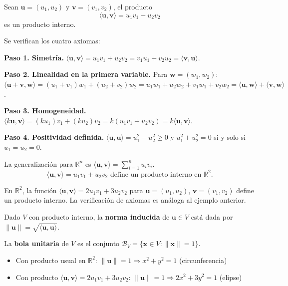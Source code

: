 \begin{example}
Sean $\mathbf{u} = (u_1, u_2)$ y $\mathbf{v} = (v_1, v_2)$, el producto $$\langle \mathbf{u}, \mathbf{v} \rangle = u_1v_1 + u_2v_2$$ es un producto interno.
\begin{myproof}
Se verifican los cuatro axiomas:

\textbf{Paso 1. Simetría.} $\langle \mathbf{u}, \mathbf{v} \rangle = u_1v_1 + u_2v_2 = v_1u_1 + v_2u_2 = \langle \mathbf{v}, \mathbf{u} \rangle$.

\textbf{Paso 2. Linealidad en la primera variable.} Para $\mathbf{w} = (w_1, w_2)$:
$\langle \mathbf{u} + \mathbf{v}, \mathbf{w} \rangle = (u_1 + v_1)w_1 + (u_2 + v_2)w_2 = u_1w_1 + u_2w_2 + v_1w_1 + v_2w_2 = \langle \mathbf{u}, \mathbf{w} \rangle + \langle \mathbf{v}, \mathbf{w} \rangle$.

\textbf{Paso 3. Homogeneidad.} $\langle k\mathbf{u}, \mathbf{v} \rangle = (ku_1)v_1 + (ku_2)v_2 = k(u_1v_1 + u_2v_2) = k\langle \mathbf{u}, \mathbf{v} \rangle$.

\textbf{Paso 4. Positividad definida.} $\langle \mathbf{u}, \mathbf{u} \rangle = u_1^2 + u_2^2 \geq 0$ y $u_1^2 + u_2^2 = 0$ si y solo si $u_1 = u_2 = 0$.

La generalización para $\mathbb{R}^n$ es $\langle \mathbf{u}, \mathbf{v} \rangle = \sum_{i=1}^n u_i v_i$.
$$\boxed{\langle \mathbf{u}, \mathbf{v} \rangle = u_1v_1 + u_2v_2 \text{ define un producto interno en } \mathbb{R}^2.}$$
\end{myproof}
\end{example}

\begin{example}
En $\mathbb{R}^2$, la función $\langle \mathbf{u}, \mathbf{v} \rangle = 2u_1v_1 + 3u_2v_2$ para $\mathbf{u} = (u_1, u_2)$, $\mathbf{v} = (v_1, v_2)$ define un producto interno. La verificación de axiomas es análoga al ejemplo anterior.
\end{example}

\begin{definition}
Dado $V$ con producto interno, la \textbf{norma inducida} de $\mathbf{u} \in V$ está dada por \(\|\mathbf{u}\| = \sqrt{\langle \mathbf{u}, \mathbf{u} \rangle}
.\)
\end{definition}

\begin{definition}
La \textbf{bola unitaria} de $V$ es el conjunto \(
\mathcal{B}_V = \{ \mathbf{x} \in V : \|\mathbf{x}\| = 1 \}.\)
\begin{itemize}
    \item Con producto usual en $\mathbb{R}^2$: $\|\mathbf{u}\| = 1 \Rightarrow x^2 + y^2 = 1$ (circunferencia)
    \item Con producto $\langle \mathbf{u}, \mathbf{v} \rangle = 2u_1v_1 + 3u_2v_2$: $\|\mathbf{u}\| = 1 \Rightarrow 2x^2 + 3y^2 = 1$ (elipse)
\end{itemize}
\end{definition}

